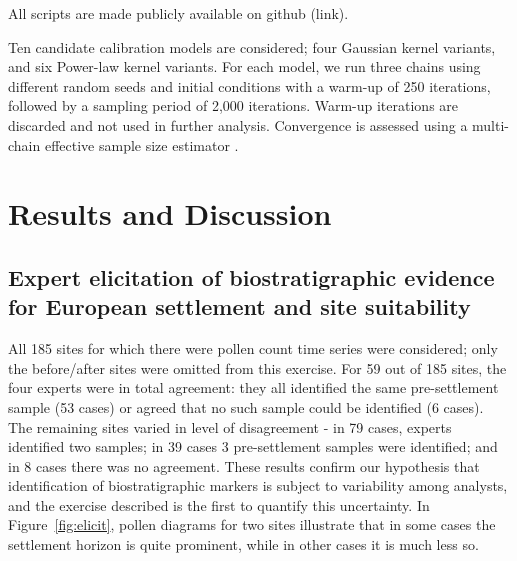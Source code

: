 \documentclass[12pt]{article}
\begin{document}
All scripts are made publicly available on github (link).

Ten candidate calibration models are considered; four Gaussian kernel
variants, and six Power-law kernel variants. For each model, we run
three chains using different random seeds and initial conditions with
a warm-up of 250 iterations, followed by a sampling period of 2,000
iterations. Warm-up iterations are discarded and not used in further
analysis. Convergence is assessed using a multi-chain effective sample
size estimator \citep{gelman2014bayesian, XXX}.




\section{Results and Discussion}

\subsection{Expert elicitation of biostratigraphic evidence for European settlement and site suitability}

All 185 sites for which there were pollen count time series were
considered; only the before/after sites were omitted from this
exercise. For 59 out of 185 sites, the four experts were in total
agreement: they all identified the same pre-settlement sample (53
cases) or agreed that no such sample could be identified (6
cases). The remaining sites varied in level of disagreement - in 79
cases, experts identified two samples; in 39 cases 3 pre-settlement
samples were identified; and in 8 cases there was no agreement. These
results confirm our hypothesis that identification of biostratigraphic
markers is subject to variability among analysts, and the exercise
described is the first to quantify this uncertainty. In
Figure~\ref{fig:elicit}, pollen diagrams for two sites illustrate that
in some cases the settlement horizon is quite prominent, while in
other cases it is much less so.
\end{document}
